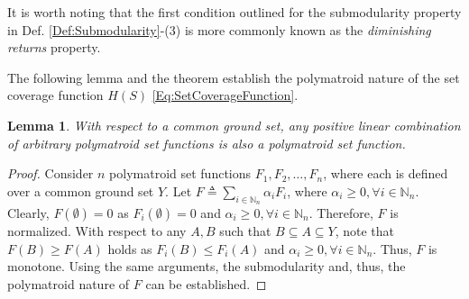 \documentclass[letterpaper, 10 pt, conference]{ieeeconf}
\newcommand{\N}{\mathbb{N}}
\newtheorem{lemma}{Lemma}
\begin{document}
It is worth noting that the first condition outlined for the submodularity property in Def. \ref{Def:Submodularity}-(3) is more commonly known as the \emph{diminishing returns} property. 

The following lemma and the theorem establish the polymatroid nature of the set coverage function $H(S)$ \eqref{Eq:SetCoverageFunction}.

\begin{lemma}\label{Lm:LinearityOfSubmodularity}
With respect to a common ground set, any positive linear combination of arbitrary polymatroid set functions is also a polymatroid set function.    
\end{lemma}
\begin{proof}
Consider $n$ polymatroid set functions $F_1,F_2,\ldots,F_n$, where each is defined over a common ground set $Y$. Let $F\triangleq \sum_{i\in\N_n} \alpha_i F_i$, where $\alpha_i \geq 0, \forall i \in\N_n$. Clearly, $F(\emptyset)=0$ as $F_i(\emptyset)=0$ and $\alpha_i \geq 0, \forall i\in\N_n$. Therefore, $F$ is normalized. With respect to any $A,B$ such that $B \subseteq A \subseteq Y$, note that $F(B)\geq F(A)$ holds as $F_i(B) \leq F_i(A)$ and $\alpha_i \geq 0, \forall i\in\N_n$. Thus, $F$ is monotone. Using the same arguments, the submodularity and, thus, the polymatroid nature of $F$ can be established.
\end{proof}
\end{document}
